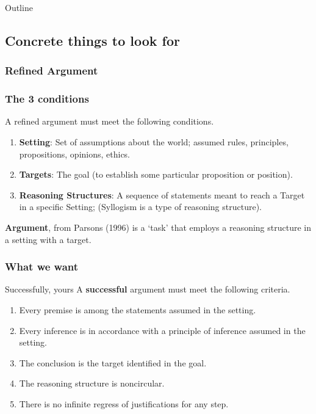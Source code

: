 \documentclass{beamer}
\begin{document}
\begin{frame}{Outline}
\subsection{Concrete things to look for}
\subsubsection{Refined Argument}
\begin{frame}\frametitle{The 3 conditions}
A refined argument must meet the following conditions.\pause
\begin{enumerate}[<+-| alert@+>]
\item \textbf{Setting}: Set of assumptions about the world; assumed rules, principles, propositions, opinions, ethics.
\item \textbf{Targets}: The goal (to establish some particular proposition or position). 
\item \textbf{Reasoning Structures}: A sequence of statements meant to reach a Target in a specific Setting; (Syllogism is a type of reasoning structure). 
\end{enumerate} \pause
\begin{exampleblock}{\textbf{Argument}, from Parsons (1996)}
 is a `task' that employs a reasoning structure in a setting with a target.
\end{exampleblock}
\end{frame}


\subsubsection{What we want}
\begin{frame}{Successfully, yours}
A \textbf{successful} argument must meet the following criteria. \pause
\begin{enumerate}[<+-| alert@+>]
\item Every premise is among the statements assumed in the setting.
\item Every inference is in accordance with a principle of inference assumed in the setting.
\item The conclusion is the target identified in the goal.
\item The reasoning structure is noncircular.
\item There is no infinite regress of justifications for any step.
\end{enumerate}
\end{frame}


\end{frame}
\end{document}
